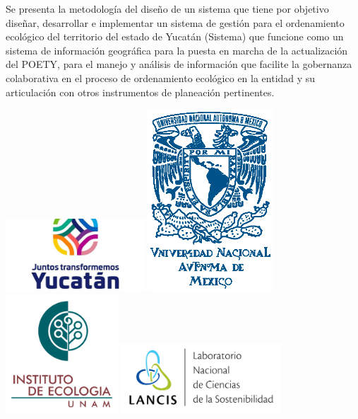 \begin{titlepage}
\begin{minipage}[t]{0.6\textwidth}
Se presenta la metodología del diseño de un sistema que tiene por objetivo diseñar, desarrollar e implementar un sistema de gestión para el ordenamiento ecológico del territorio del estado de Yucatán (Sistema) que funcione como un sistema de información geográfica para la puesta en marcha de la actualización del POETY, para el manejo y análisis  de información que facilite la gobernanza colaborativa en el proceso de ordenamiento ecológico en la entidad y su articulación con otros instrumentos de planeación pertinentes.
\end{minipage}%
\hfill
\begin{minipage}[t]{0.25\textwidth} 
  \includegraphics[width=52mm]{images/yucatan_logo}\vspace{2cm}
  \includegraphics[width=47mm]{images/UNAM}\vspace{2cm}
  \includegraphics[width=42mm]{images/ie_logo}\vspace{2cm}
  \includegraphics[width=60mm]{images/lancis_logo}  
\end{minipage}

\end{titlepage}

\pagebreak

\restoregeometry